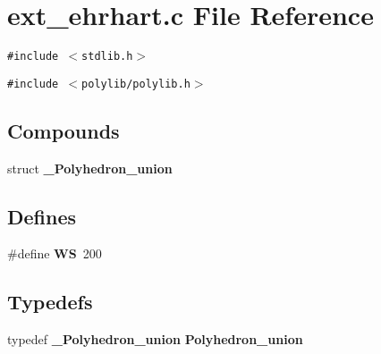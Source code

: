 \section{ext\_\-ehrhart.c File Reference}
\label{ext__ehrhart_8c}
{\tt \#include $<$stdlib.h$>$}\par
{\tt \#include $<$polylib/polylib.h$>$}\par
\subsection*{Compounds}
\begin{CompactItemize}
\item 
struct {\bf \_\-Polyhedron\_\-union}
\end{CompactItemize}
\subsection*{Defines}
\begin{CompactItemize}
\item 
\#define {\bf WS}\ 200
\end{CompactItemize}
\subsection*{Typedefs}
\begin{CompactItemize}
\item 
typedef {\bf \_\-Polyhedron\_\-union} {\bf Polyhedron\_\-union}
\end{CompactItemize}
